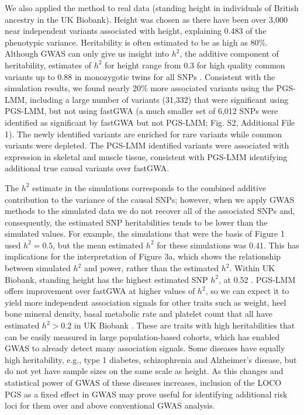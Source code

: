 \documentclass[doublespacing]{bmcart}
\begin{document}
We also applied the method to real data (standing height in individuals of British ancestry in the UK Biobank). Height was chosen as there have been over 3,000 near independent variants associated with height, explaining 0.483 of the phenotypic variance. Heritability is often estimated to be as high as 80\%. Although GWAS can only give us insight into $h^2$, the additive component of heritability, estimates of $h^2$ for height range from 0.3 for high quality common variants up to 0.88 in monozygotic twins for all SNPs \cite{yengo2018meta,hou2019accurate,nolte2017comparison}. Consistent with the simulation results, we found nearly 20\% more associated variants using the PGS-LMM, including a large number of variants (31,332) that were significant using PGS-LMM, but not using fastGWA (a much smaller set of 6,012 SNPs were identified as significant by fastGWA but not PGS-LMM; Fig. S2, Additional File 1). The newly identified variants are enriched for rare variants while common variants were depleted. The PGS-LMM identified variants were associated with expression in skeletal and muscle tissue, consistent with PGS-LMM identifying additional true causal variants over fastGWA.  

The $h^2$ estimate in the simulations corresponds to the combined additive contribution to the variance of the causal SNPs; however, when we apply GWAS methods to the simulated data we do not recover all of the associated SNPs and, consequently, the estimated SNP heritabilities tends to be lower than the simulated values. For example, the simulations that were the basis of Figure 1 used $h^2 = 0.5$, but the mean estimated $h^2$ for these simulations was 0.41. This has implications for the interpretation of Figure 3a, which shows the relationship between simulated $h^2$ and power, rather than the estimated $h^2$.  Within UK Biobank, standing height has the highest estimated SNP $h^2$, at 0.52 \cite{jiang2019resource}.  PGS-LMM offers improvement over fastGWA at higher values of $h^2$, so we can expect it to yield more independent association signals for other traits such as weight, heel bone mineral density, basal metabolic rate and platelet count that all have estimated $h^2 > 0.2$ in UK Biobank \cite{jiang2019resource,watanabe2019global}. These are traits with high heritabilities that can be easily measured in large population-based cohorts, which has enabled GWAS to already detect many association signals. Some diseases have equally high heritability, e.g., type 1 diabetes, schizophrenia and Alzheimer’s disease, but do not yet have sample sizes on the same scale as height. As this changes and statistical power of GWAS of these diseases increases, inclusion of the LOCO PGS as a fixed effect in GWAS may prove useful for identifying additional risk loci for them over and above conventional GWAS analysis. 
\end{document}
